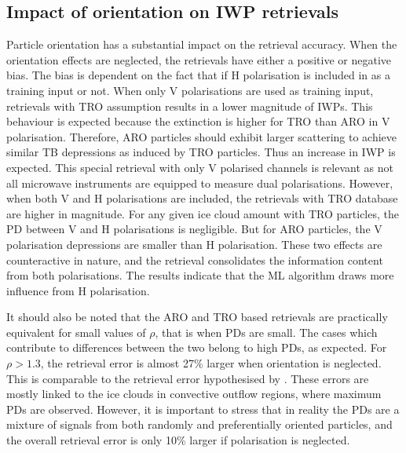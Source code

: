 \documentclass[amt, manuscript]{copernicus}
\begin{document}
\subsection{Impact of orientation on IWP retrievals}
%
Particle orientation has a substantial impact on the retrieval accuracy. When the orientation effects are neglected, the retrievals have either a  positive or negative bias. The bias is dependent on the fact that if H polarisation is included in as a training input or not. When only V polarisations are used as training input, retrievals with TRO assumption results in a lower magnitude of IWPs. This behaviour is expected because the extinction is higher for TRO than ARO in V polarisation. Therefore, ARO particles should exhibit larger scattering to achieve similar TB depressions as induced by TRO particles. Thus an increase in IWP is expected. This special retrieval with only V polarised channels is relevant as not all microwave instruments are equipped to measure dual polarisations. However, when both V  and H  polarisations are included, the retrievals with TRO database are higher in magnitude. For any given ice cloud amount with TRO particles, the PD between V  and H  polarisations is negligible. But for ARO particles, the V polarisation depressions are smaller than H polarisation. These two effects are counteractive in nature, and the retrieval consolidates the information content from both polarisations. The results indicate that the ML algorithm draws more influence from H polarisation. 

It should also be noted that the ARO and TRO based retrievals are practically equivalent for small values of $\rho$, that is when PDs are small. The cases which contribute to differences between the two belong to high PDs, as expected. For $\rho > 1.3$, the retrieval error is almost 27\% larger when orientation is neglected. This is comparable to the retrieval error hypothesised by \citet{gong:micro:17}. These errors are mostly linked to the ice clouds in convective outflow regions, where maximum PDs are observed. However, it is important to stress  that in reality the PDs are a mixture of signals from both randomly and preferentially oriented particles, and the overall retrieval error is only 10\% larger if polarisation is neglected. 
\end{document}
